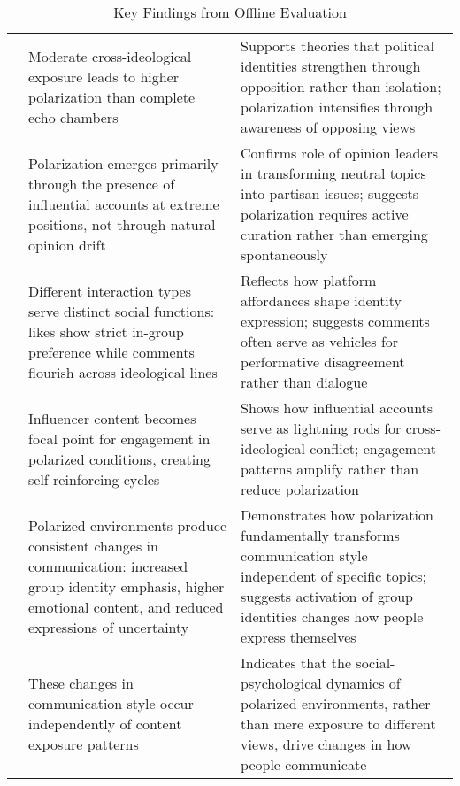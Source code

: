 \begin{table*}[h!]
\centering
\small
\caption{Key Findings from Offline Evaluation}
\label{tab:offline-evaluation-findings}
\begin{tabularx}{\textwidth}{>{\centering\arraybackslash}p{1.5cm}>{\raggedright\arraybackslash}X>{\raggedright\arraybackslash}X}
\toprule
\multicolumn{1}{c}{\textbf{Analysis}} & \multicolumn{1}{c}{\textbf{Key Finding}} & \multicolumn{1}{c}{\textbf{Theoretical Implication}} \\
\midrule
\multirow{2}{*}{\rotatebox[origin=c]{90}{\textbf{Polarization}}} 
    & Moderate cross-ideological exposure leads to higher polarization than complete echo chambers 
    & Supports theories that political identities strengthen through opposition rather than isolation; polarization intensifies through awareness of opposing views \\
\cmidrule{2-3}
    & Polarization emerges primarily through the presence of influential accounts at extreme positions, not through natural opinion drift 
    & Confirms role of opinion leaders in transforming neutral topics into partisan issues; suggests polarization requires active curation rather than emerging spontaneously \\
\midrule
\multirow{2}{*}{\rotatebox[origin=c]{90}{\textbf{Interaction}}} 
    & Different interaction types serve distinct social functions: likes show strict in-group preference while comments flourish across ideological lines 
    & Reflects how platform affordances shape identity expression; suggests comments often serve as vehicles for performative disagreement rather than dialogue \\
\cmidrule{2-3}
    & Influencer content becomes focal point for engagement in polarized conditions, creating self-reinforcing cycles 
    & Shows how influential accounts serve as lightning rods for cross-ideological conflict; engagement patterns amplify rather than reduce polarization \\
\midrule
\multirow{2}{*}{\rotatebox[origin=c]{90}{\textbf{Content}}} 
    & Polarized environments produce consistent changes in communication: increased group identity emphasis, higher emotional content, and reduced expressions of uncertainty 
    & Demonstrates how polarization fundamentally transforms communication style independent of specific topics; suggests activation of group identities changes how people express themselves \\
\cmidrule{2-3}
    & These changes in communication style occur independently of content exposure patterns 
    & Indicates that the social-psychological dynamics of polarized environments, rather than mere exposure to different views, drive changes in how people communicate \\
\bottomrule
\end{tabularx}
\end{table*}